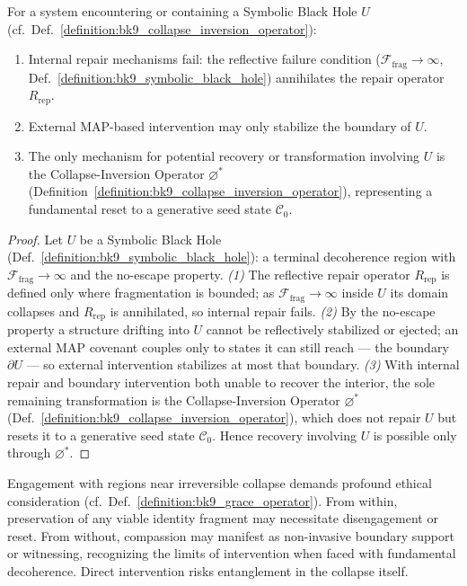 \begin{proposition}
\label{proposition:bk9_escape_from_irreversible_collapse}
For a system encountering or containing a Symbolic Black Hole $U$ (cf.~Def.~\ref{definition:bk9_collapse_inversion_operator}):
\begin{enumerate}
    \item Internal repair mechanisms fail: the reflective failure condition ($\mathcal{F}_{\text{frag}} \to \infty$, Def.~\ref{definition:bk9_symbolic_black_hole}) annihilates the repair operator $R_{\text{rep}}$.
    \item External MAP-based intervention may only stabilize the boundary of $U$.
    \item The only mechanism for potential recovery or transformation involving $U$ is the Collapse-Inversion Operator $\varnothing^*$ (Definition~\ref{definition:bk9_collapse_inversion_operator}), representing a fundamental reset to a generative seed state $\mathcal{C}_0$.
\end{enumerate}
\end{proposition}
\begin{proof}
\label{proof:bk9_escape_from_irreversible_collapse}
\leavevmode
Let $U$ be a Symbolic Black Hole (Def.~\ref{definition:bk9_symbolic_black_hole}): a terminal decoherence region with $\mathcal{F}_{\text{frag}}\to\infty$ and the no-escape property. \emph{(1)} The reflective repair operator $R_{\text{rep}}$ is defined only where fragmentation is bounded; as $\mathcal{F}_{\text{frag}}\to\infty$ inside $U$ its domain collapses and $R_{\text{rep}}$ is annihilated, so internal repair fails. \emph{(2)} By the no-escape property a structure drifting into $U$ cannot be reflectively stabilized or ejected; an external MAP covenant couples only to states it can still reach --- the boundary $\partial U$ --- so external intervention stabilizes at most that boundary. \emph{(3)} With internal repair and boundary intervention both unable to recover the interior, the sole remaining transformation is the Collapse-Inversion Operator $\varnothing^*$ (Def.~\ref{definition:bk9_collapse_inversion_operator}), which does not repair $U$ but resets it to a generative seed state $\mathcal{C}_0$. Hence recovery involving $U$ is possible only through $\varnothing^*$.
\end{proof}
\begin{scholium}
\label{scholium:bk9_ethics_near_the_singularity}
Engagement with regions near irreversible collapse demands profound ethical consideration (cf.~Def.~\ref{definition:bk9_grace_operator}). From within, preservation of any viable identity fragment may necessitate disengagement or reset. From without, compassion may manifest as non-invasive boundary support or witnessing, recognizing the limits of intervention when faced with fundamental decoherence. Direct intervention risks entanglement in the collapse itself.
\end{scholium}
